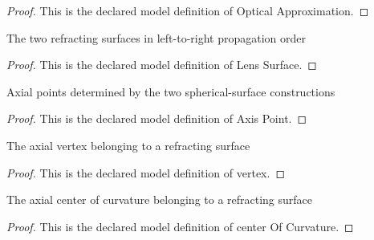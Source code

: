 \begin{proof}
  This is the declared model definition of Optical Approximation.
\end{proof}
\begin{definition}
  \label{def:physics:phyx-mini-0067:phyxminiproblems-problemphyxmini0067-lenssurface}
  The two refracting surfaces in left-to-right propagation order
\end{definition}
\begin{proof}
  This is the declared model definition of Lens Surface.
\end{proof}
\begin{definition}
  \label{def:physics:phyx-mini-0067:phyxminiproblems-problemphyxmini0067-axispoint}
  Axial points determined by the two spherical-surface constructions
\end{definition}
\begin{proof}
  This is the declared model definition of Axis Point.
\end{proof}
\begin{definition}[vertex]
  \label{def:physics:phyx-mini-0067:phyxminiproblems-problemphyxmini0067-lenssurface-vertex}
  The axial vertex belonging to a refracting surface
\end{definition}
\begin{proof}
  This is the declared model definition of vertex.
\end{proof}
\begin{definition}
  \label{def:physics:phyx-mini-0067:phyxminiproblems-problemphyxmini0067-lenssurface-centerofcurvature}
  The axial center of curvature belonging to a refracting surface
\end{definition}
\begin{proof}
  This is the declared model definition of center Of Curvature.
\end{proof}
